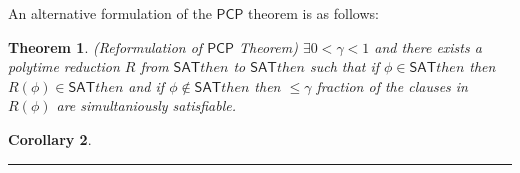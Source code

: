 \documentclass[twoside]{article}
\newcounter{lecnum}
\newtheorem{theorem}{Theorem}[lecnum]
\newtheorem{corollary}[theorem]{Corollary}
\newenvironment{proof}{{\bf Proof:}}{\hfill\rule{2mm}{2mm}}
\def\SAT{\mathsf{SAT} then }
\def\PCP{\mathsf{PCP}}
\begin{document}
An alternative formulation of the $\PCP$ theorem is as follows:
\begin{theorem}
(Reformulation of $\PCP$ Theorem) $\exists 0 < \gamma < 1$ and there exists a polytime reduction $R$ from $\SAT$ to $\SAT$ such that if $\phi \in \SAT$ then $R(\phi) \in \SAT$ and if $\phi \notin \SAT$ then $\leq \gamma$ fraction of the clauses in $R(\phi)$ are simultaniously satisfiable.
\end{theorem}

\begin{corollary}

\end{corollary}
\begin{proof}

\end{proof}
\end{document}
